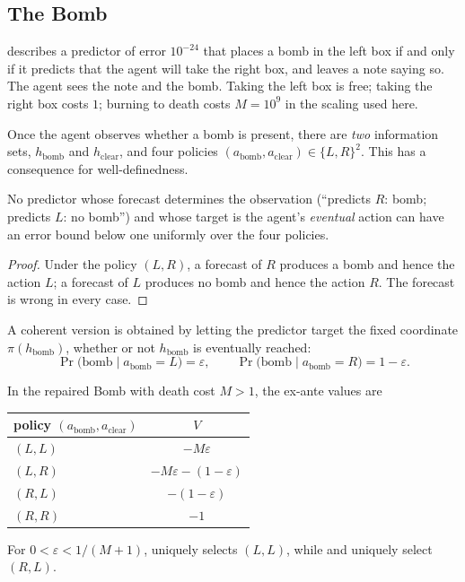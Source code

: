 \subsection{The Bomb}\label{sec:bomb}

\textcite{macaskill2019} describes a predictor of error $10^{-24}$ that places a bomb in the left
box if and only if it predicts that the agent will take the right box, and leaves a note saying so.
The agent sees the note and the bomb. Taking the left box is free; taking the right box costs $1$;
burning to death costs $M=10^{9}$ in the scaling used here.

Once the agent observes whether a bomb is present, there are \emph{two} information sets,
$h_{\mathrm{bomb}}$ and $h_{\mathrm{clear}}$, and four policies
$(a_{\mathrm{bomb}},a_{\mathrm{clear}})\in\{L,R\}^2$. This has a consequence for well-definedness.

\begin{proposition}\label{prop:bombill}
No predictor whose forecast determines the observation (\enquote{predicts $R$: bomb; predicts $L$:
no bomb}) and whose target is the agent's \emph{eventual} action can have an error bound below one
uniformly over the four policies.
\end{proposition}

\begin{proof}
Under the policy $(L,R)$, a forecast of $R$ produces a bomb and hence the action $L$; a forecast of $L$
produces no bomb and hence the action $R$. The forecast is wrong in every case.
\end{proof}

A coherent version is obtained by letting the predictor target the fixed coordinate
$\pi(h_{\mathrm{bomb}})$, whether or not $h_{\mathrm{bomb}}$ is eventually reached:
\[
  \Pr\bigl(\text{bomb}\mid a_{\mathrm{bomb}}=L\bigr)=\varepsilon,\qquad
  \Pr\bigl(\text{bomb}\mid a_{\mathrm{bomb}}=R\bigr)=1-\varepsilon.
\]

\begin{proposition}\label{prop:bomb}
In the repaired Bomb with death cost $M>1$, the ex-ante values are
\begin{center}
\small
\begin{tabular}{@{}lc@{}}
  \toprule
  policy $(a_{\mathrm{bomb}},a_{\mathrm{clear}})$ & $V$ \\
  \midrule
  $(L,L)$ & $-M\varepsilon$ \\
  $(L,R)$ & $-M\varepsilon-(1-\varepsilon)$ \\
  $(R,L)$ & $-(1-\varepsilon)$ \\
  $(R,R)$ & $-1$ \\
  \bottomrule
\end{tabular}
\end{center}
For $0<\varepsilon<1/(M+1)$,  uniquely selects $(L,L)$, while  and  uniquely
select $(R,L)$.
\end{proposition}

